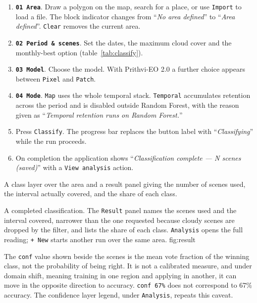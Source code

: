 \documentclass[12pt,a4paper]{article}
\newcommand{\msg}[1]{``\textit{#1}''}
\begin{document}

\begin{enumerate}[leftmargin=*,itemsep=.3em]
  \item \textbf{\texttt{01 Area}}. Draw a polygon on the map, search for a
        place, or use \texttt{Import} to load a file. The block indicator
        changes from \msg{No area defined} to \msg{Area defined}.
        \texttt{Clear} removes the current area.
  \item \textbf{\texttt{02 Period \& scenes}}. Set the dates, the maximum cloud
        cover and the monthly-best option (table~\ref{tab:classify}).
  \item \textbf{\texttt{03 Model}}. Choose the model. With Prithvi-EO 2.0 a
        further choice appears between \texttt{Pixel} and \texttt{Patch}.
  \item \textbf{\texttt{04 Mode}}. \texttt{Map} uses the whole temporal stack.
        \texttt{Temporal} accumulates retention across the period and is
        disabled outside Random Forest, with the reason given as
        \msg{Temporal retention runs on Random Forest.}
  \item Press \texttt{Classify}. The progress bar replaces the button label
        with \msg{Classifying} while the run proceeds.
  \item On completion the application shows \msg{Classification complete ---
        N scenes (saved)} with a \texttt{View analysis} action.
\end{enumerate}

 A class layer over the area and a result panel giving
the number of scenes used, the interval actually covered, and the share of each
class.

  {A completed classification. The \texttt{Result} panel names the scenes used
   and the interval covered, narrower than the one requested because cloudy
   scenes are dropped by the filter, and lists the share of each class.
   \texttt{Analysis} opens the full reading; \texttt{+ New} starts another run
   over the same area.}
  {fig:result}

\begin{objecao}
The \texttt{conf} value shown beside the scenes is the mean vote fraction of
the winning class, not the probability of being right. It is not a calibrated
measure, and under domain shift, meaning training in one region and applying in
another, it can move in the opposite direction to accuracy. \texttt{conf 67\%}
does not correspond to 67\% accuracy. The confidence layer legend, under
\texttt{Analysis}, repeats this caveat.
\end{objecao}
\end{document}
